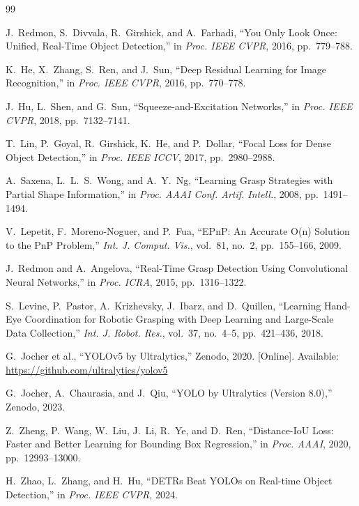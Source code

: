 \documentclass[conference]{IEEEtran}
\begin{document}
\begin{thebibliography}{99}

J.~Redmon, S.~Divvala, R.~Girshick, and A.~Farhadi,
``You Only Look Once: Unified, Real-Time Object Detection,''
in \textit{Proc. IEEE CVPR}, 2016, pp.~779--788.

K.~He, X.~Zhang, S.~Ren, and J.~Sun,
``Deep Residual Learning for Image Recognition,''
in \textit{Proc. IEEE CVPR}, 2016, pp.~770--778.

J.~Hu, L.~Shen, and G.~Sun,
``Squeeze-and-Excitation Networks,''
in \textit{Proc. IEEE CVPR}, 2018, pp.~7132--7141.

T.~Lin, P.~Goyal, R.~Girshick, K.~He, and P.~Dollar,
``Focal Loss for Dense Object Detection,''
in \textit{Proc. IEEE ICCV}, 2017, pp.~2980--2988.

A.~Saxena, L.~L.~S.~Wong, and A.~Y.~Ng,
``Learning Grasp Strategies with Partial Shape Information,''
in \textit{Proc. AAAI Conf. Artif. Intell.}, 2008, pp.~1491--1494.

V.~Lepetit, F.~Moreno-Noguer, and P.~Fua,
``EPnP: An Accurate O(n) Solution to the PnP Problem,''
\textit{Int. J. Comput. Vis.}, vol.~81, no.~2, pp.~155--166, 2009.

J.~Redmon and A.~Angelova,
``Real-Time Grasp Detection Using Convolutional Neural Networks,''
in \textit{Proc. ICRA}, 2015, pp.~1316--1322.

S.~Levine, P.~Pastor, A.~Krizhevsky, J.~Ibarz, and D.~Quillen,
``Learning Hand-Eye Coordination for Robotic Grasping with Deep Learning and
Large-Scale Data Collection,''
\textit{Int. J. Robot. Res.}, vol.~37, no.~4--5, pp.~421--436, 2018.

G.~Jocher et al.,
``YOLOv5 by Ultralytics,''
Zenodo, 2020. [Online]. Available: \url{https://github.com/ultralytics/yolov5}

G.~Jocher, A.~Chaurasia, and J.~Qiu,
``YOLO by Ultralytics (Version 8.0),''
Zenodo, 2023.

Z.~Zheng, P.~Wang, W.~Liu, J.~Li, R.~Ye, and D.~Ren,
``Distance-IoU Loss: Faster and Better Learning for Bounding Box Regression,''
in \textit{Proc. AAAI}, 2020, pp.~12993--13000.

H.~Zhao, L.~Zhang, and H.~Hu,
``DETRs Beat YOLOs on Real-time Object Detection,''
in \textit{Proc. IEEE CVPR}, 2024.

\end{thebibliography}
\end{document}
